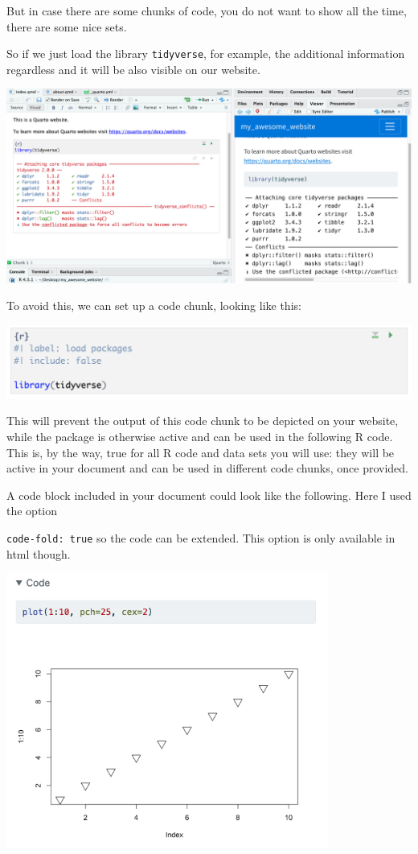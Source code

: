 \documentclass[
  letterpaper,
  DIV=11,
  numbers=noendperiod]{scrreprt}
\begin{document}
But in case there are some chunks of code, you do not want to show all
the time, there are some nice sets.

So if we just load the library \texttt{tidyverse}, for example, the
additional information regardless and it will be also visible on our
website.

\includegraphics{img/quarto_intro/Screenshot 2023-10-11 at 14.49.43.png}

To avoid this, we can set up a code chunk, looking like this:

\includegraphics{img/quarto_intro/Screenshot 2023-10-11 at 14.55.13.png}

This will prevent the output of this code chunk to be depicted on your
website, while the package is otherwise active and can be used in the
following R code. This is, by the way, true for all R code and data sets
you will use: they will be active in your document and can be used in
different code chunks, once provided.

A code block included in your document could look like the following.
Here I used the option

\texttt{code-fold:\ true} so the code can be extended. This option is
only available in html though.

\includegraphics[width=4.16667in,height=\textheight]{img/quarto_intro/Screenshot 2023-10-17 at 17.05.28.png}
\end{document}
